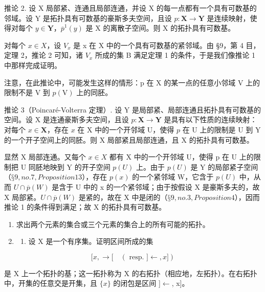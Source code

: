 推论 2. 设 X 局部紧、连通且局部连通，并设 X 的每一点都有一个具有可数基的邻域。设 Y 是拓扑具有可数基的豪斯多夫空间，且设 \(p: \mathbf{X} \to \mathbf{Y}\) 是连续映射，使得对每个 \(y \in \mathbf{Y}\)，\(\overline{p}^1(y)\) 是 X 的离散子空间。则 X 的拓扑具有可数基。

对每个 \(x \in X\)，设 \(V_{x}\) 是 x 在 X 中的一个具有可数基的紧邻域。由 §9，第 4 目，定理 2，推论 2 可知，诸 \(V_{x}\) 所成的集 B 满足定理 1 的条件，于是我们像推论 1 中那样完成证明。

注意，在此推论中，可能发生这样的情形：p 在 X 的某一点的任意小邻域 V 上的限制不是 V 到 \(p(\mathrm{V})\) 上的同胚。

推论 3（Poincaré-Volterra 定理）. 设 Y 是局部紧、局部连通且拓扑具有可数基的空间。设 X 是连通豪斯多夫空间，且设 \(p: \mathbf{X} \to \mathbf{Y}\) 是具有以下性质的连续映射：对每个 \(x \in \mathbf{X}\)，存在 \(x\) 在 X 中的一个开邻域 U，使得 \(p\) 在 U 上的限制是 U 到 Y 的一个开子空间上的同胚。则 X 局部紧且局部连通，且 X 的拓扑具有可数基。

显然 X 局部连通。又每个 \(x \in X\) 都有 X 中的一个开邻域 U，使得 p 在 U 上的限制把 U 同胚地映到 Y 的开子空间 \(p(U)\) 上。由于 \(p(U)\) 是 Y 的局部紧子空间（\(§ 9, no. 7, Proposition 13\)），存在 \(p(x)\) 的一个紧邻域 W，它含于 \(p(U)\) 中，从而 \(U \cap \overline{p}(W)\) 是含于 U 中的 x 的一个紧邻域；由于按假设 X 是豪斯多夫的，故 X 局部紧。\(U \cap \overline{p}(W)\) 是紧的，故在 X 中是闭的（\(§ 9, no. 3, Proposition 4\)），因而推论 1 的条件得到满足；故 X 的拓扑具有可数基。

\BourbakiExercises
\BourbakiExerciseGroup

\begin{enumerate}
\def\labelenumi{\arabic{enumi})}
\item
  求出两个元素的集合或三个元素的集合上的所有可能的拓扑。
\item
  \begin{enumerate}
  \def\labelenumii{\alph{enumii})}
  \tightlist
  \item
    设 X 是一个有序集。证明区间所成的集
  \end{enumerate}
\end{enumerate}

\[
[ x, \rightarrow [ \quad (\text { resp. } ] \leftarrow , x ])
\]

是 X 上一个拓扑的基；这一拓扑称为 X 的右拓扑（相应地，左拓扑）。在右拓扑中，开集的任意交是开集，且 \(\{x\}\) 的闭包是区间 {]}\(\leftarrow\), x{]}。

